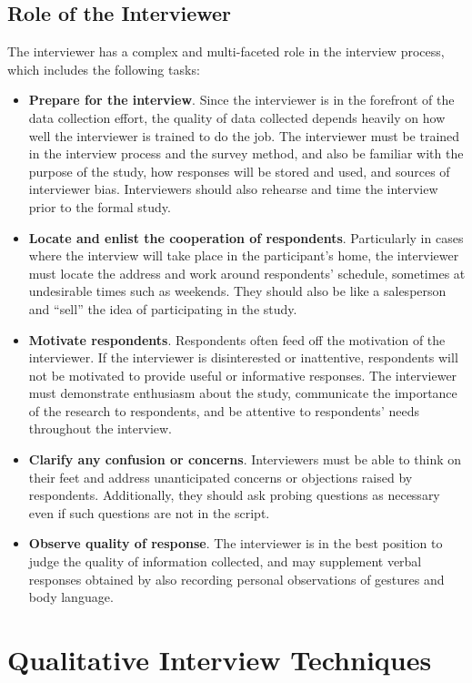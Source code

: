 \subsection{Role of the Interviewer}

The interviewer has a complex and multi-faceted role in the interview process, which includes the following tasks:

\begin{itemize}
	\item \textbf{Prepare for the interview}. Since the interviewer is in the forefront of the data collection effort, the quality of data collected depends heavily on how well the interviewer is trained to do the job. The interviewer must be trained in the interview process and the survey method, and also be familiar with the purpose of the study, how responses will be stored and used, and sources of interviewer bias. Interviewers should also rehearse and time the interview prior to the formal study.
	\item \textbf{Locate and enlist the cooperation of respondents}. Particularly in cases where the interview will take place in the participant's home, the interviewer must locate the address and work around respondents' schedule, sometimes at undesirable times such as weekends. They should also be like a salesperson and ``sell'' the idea of participating in the study.
	\item \textbf{Motivate respondents}. Respondents often feed off the motivation of the interviewer. If the interviewer is disinterested or inattentive, respondents will not be motivated to provide useful or informative responses. The interviewer must demonstrate enthusiasm about the study, communicate the importance of the research to respondents, and be attentive to respondents' needs throughout the interview. 
	\item \textbf{Clarify any confusion or concerns}. Interviewers must be able to think on their feet and address unanticipated concerns or objections raised by respondents. Additionally, they should ask probing questions as necessary even if such questions are not in the script.
	\item \textbf{Observe quality of response}. The interviewer is in the best position to judge the quality of information collected, and may supplement verbal responses obtained by also recording personal observations of gestures and body language.
\end{itemize}

\section{Qualitative Interview Techniques}

